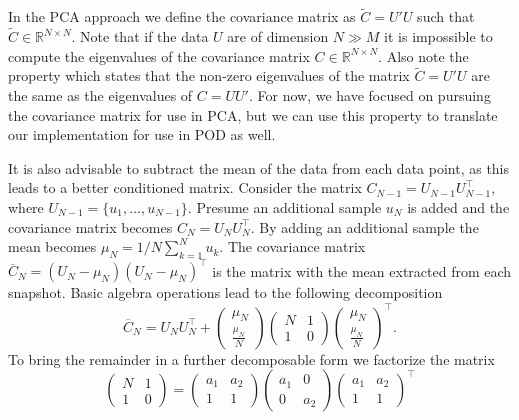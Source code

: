 \documentclass[onecolumn]{webofc}
\begin{document}
In the PCA approach we define the covariance matrix as $\widetilde{C}=U'U$ such that $\widetilde{C}\in \mathbb R^{N\times N}$. Note that if the data $U$ are of dimension $N\gg M$ it is impossible to compute the eigenvalues of the covariance matrix $C\in \mathbb R^{N\times N}$. Also note the property which states that the non-zero eigenvalues of the matrix $\widetilde{C}=U'U$ are the same as the eigenvalues of $C=UU'$. For now, we have focused on pursuing the covariance matrix for use in PCA, but we can use this property to translate our implementation for use in POD as well.

It is also advisable to subtract the mean of the data from each data point, as this leads to a better conditioned matrix. Consider the matrix $C_{N-1}=U_{N-1}U_{N-1}^{\top}$, where $U_{N-1}=\{u_1,\ldots, u_{N-1}\}$. Presume an additional sample $u_{N}$ is added and the covariance matrix becomes $C_{N}=U_{N}U_{N}^{\top}$. By adding an additional sample the mean becomes $\mu_{N}=1/N\sum_{k=1}^{N} u_k$.
The covariance matrix $\overline{C}_{N}=(U_{N}-\mu_{N})(U_{N}-\mu_{N})^{\top}$ is the matrix with the mean extracted from each snapshot. Basic algebra operations lead to the following decomposition 
\begin{equation}
\overline{C}_{N}=U_{N}U_{N}^{\top}+\begin{pmatrix}
\mu_{N} \\
\frac{\mu_{N}}{N}
\end{pmatrix}\begin{pmatrix}N & 1\\
1 & 0 
\end{pmatrix} \begin{pmatrix}
\mu_{N} \\
\frac{\mu_{N}}{N}
\end{pmatrix}^{\top}.
\end{equation}
To bring the remainder in a further decomposable form we factorize the matrix 
\begin{equation}
\begin{pmatrix}N & 1\\
1 & 0 
\end{pmatrix}=\begin{pmatrix}a_1 & a_2\\
1 & 1 
\end{pmatrix}\begin{pmatrix}a_1 & 0\\
0 & a_2 
\end{pmatrix}\begin{pmatrix}a_1 & a_2\\
1 & 1 
\end{pmatrix}^{\top}
\end{equation}
\end{document}
